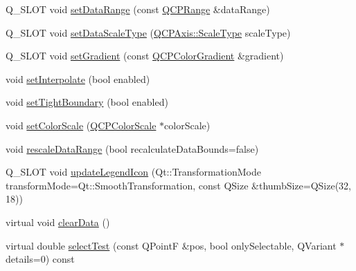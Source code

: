 \begin{DoxyCompactItemize}
\item 
Q\+\_\+\+S\+L\+OT void \mbox{\hyperlink{class_q_c_p_color_map_a980b42837821159786a85b4b7dcb8774}{set\+Data\+Range}} (const \mbox{\hyperlink{class_q_c_p_range}{Q\+C\+P\+Range}} \&data\+Range)
\item 
Q\+\_\+\+S\+L\+OT void \mbox{\hyperlink{class_q_c_p_color_map_a9d20aa08e3c1f20f22908c45b9c06511}{set\+Data\+Scale\+Type}} (\mbox{\hyperlink{class_q_c_p_axis_a36d8e8658dbaa179bf2aeb973db2d6f0}{Q\+C\+P\+Axis\+::\+Scale\+Type}} scale\+Type)
\item 
Q\+\_\+\+S\+L\+OT void \mbox{\hyperlink{class_q_c_p_color_map_a7313c78360471cead3576341a2c50377}{set\+Gradient}} (const \mbox{\hyperlink{class_q_c_p_color_gradient}{Q\+C\+P\+Color\+Gradient}} \&gradient)
\item 
void \mbox{\hyperlink{class_q_c_p_color_map_a484eaa8a5065cfc386b15375bf98b964}{set\+Interpolate}} (bool enabled)
\item 
void \mbox{\hyperlink{class_q_c_p_color_map_ad03221cc285e5f562a0b13d684b5576d}{set\+Tight\+Boundary}} (bool enabled)
\item 
void \mbox{\hyperlink{class_q_c_p_color_map_aa828921db364fe3c6af4619580ab85fd}{set\+Color\+Scale}} (\mbox{\hyperlink{class_q_c_p_color_scale}{Q\+C\+P\+Color\+Scale}} $\ast$color\+Scale)
\item 
void \mbox{\hyperlink{class_q_c_p_color_map_a856608fa3dd1cc290bcd5f29a5575774}{rescale\+Data\+Range}} (bool recalculate\+Data\+Bounds=false)
\item 
Q\+\_\+\+S\+L\+OT void \mbox{\hyperlink{class_q_c_p_color_map_a5d8158b62d55fcfeaabcb68ce0083e87}{update\+Legend\+Icon}} (Qt\+::\+Transformation\+Mode transform\+Mode=Qt\+::\+Smooth\+Transformation, const Q\+Size \&thumb\+Size=Q\+Size(32, 18))
\item 
virtual void \mbox{\hyperlink{class_q_c_p_color_map_a0545dce5383766885912331705a8e099}{clear\+Data}} ()
\item 
virtual double \mbox{\hyperlink{class_q_c_p_color_map_aba91ea58b489031157ecb777fe79e309}{select\+Test}} (const Q\+PointF \&pos, bool only\+Selectable, Q\+Variant $\ast$details=0) const
\end{DoxyCompactItemize}
